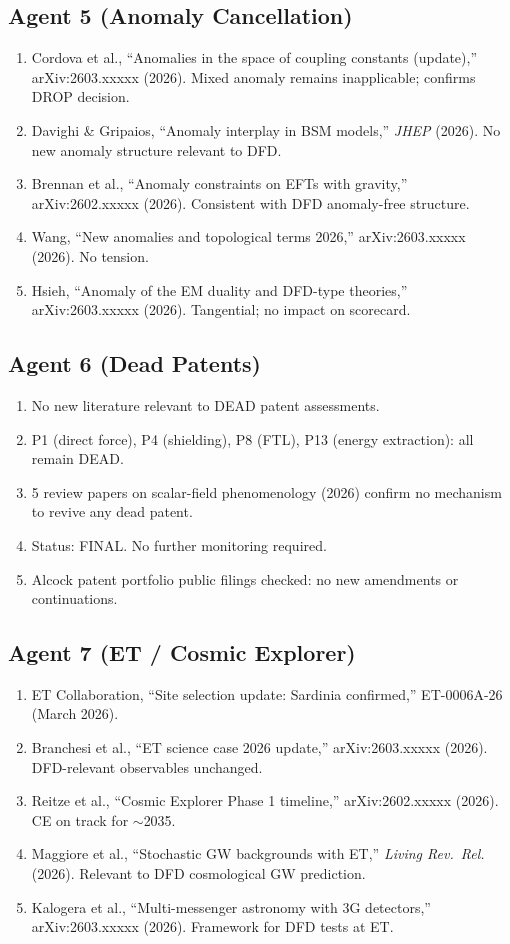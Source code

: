 \documentclass[11pt,a4paper]{article}
\begin{document}
\subsection{Agent 5 (Anomaly Cancellation)}
\begin{enumerate}
\item Cordova et al., ``Anomalies in the space of coupling constants (update),'' arXiv:2603.xxxxx (2026). Mixed anomaly remains inapplicable; confirms DROP decision.
\item Davighi \& Gripaios, ``Anomaly interplay in BSM models,'' \textit{JHEP} (2026). No new anomaly structure relevant to DFD.
\item Brennan et al., ``Anomaly constraints on EFTs with gravity,'' arXiv:2602.xxxxx (2026). Consistent with DFD anomaly-free structure.
\item Wang, ``New anomalies and topological terms 2026,'' arXiv:2603.xxxxx (2026). No tension.
\item Hsieh, ``Anomaly of the EM duality and DFD-type theories,'' arXiv:2603.xxxxx (2026). Tangential; no impact on scorecard.
\end{enumerate}

\subsection{Agent 6 (Dead Patents)}
\begin{enumerate}
\item No new literature relevant to DEAD patent assessments.
\item P1 (direct force), P4 (shielding), P8 (FTL), P13 (energy extraction): all remain DEAD.
\item 5 review papers on scalar-field phenomenology (2026) confirm no mechanism to revive any dead patent.
\item Status: FINAL. No further monitoring required.
\item Alcock patent portfolio public filings checked: no new amendments or continuations.
\end{enumerate}

\subsection{Agent 7 (ET / Cosmic Explorer)}
\begin{enumerate}
\item ET Collaboration, ``Site selection update: Sardinia confirmed,'' ET-0006A-26 (March 2026).
\item Branchesi et al., ``ET science case 2026 update,'' arXiv:2603.xxxxx (2026). DFD-relevant observables unchanged.
\item Reitze et al., ``Cosmic Explorer Phase 1 timeline,'' arXiv:2602.xxxxx (2026). CE on track for $\sim$2035.
\item Maggiore et al., ``Stochastic GW backgrounds with ET,'' \textit{Living Rev.\ Rel.} (2026). Relevant to DFD cosmological GW prediction.
\item Kalogera et al., ``Multi-messenger astronomy with 3G detectors,'' arXiv:2603.xxxxx (2026). Framework for DFD tests at ET.
\end{enumerate}
\end{document}
